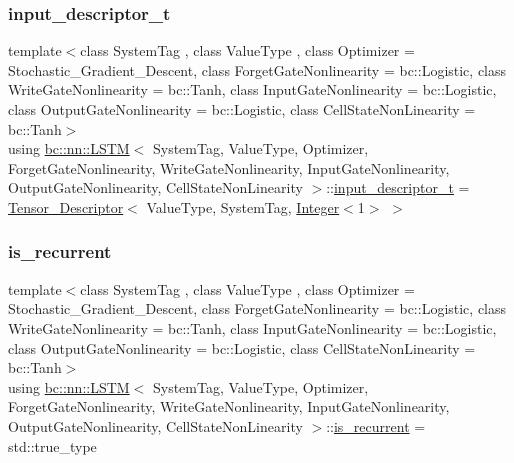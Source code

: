 \mbox{\label{structbc_1_1nn_1_1LSTM_aab44654006b4410cc4a26d2a592776e1}} 
\subsubsection{\texorpdfstring{input\+\_\+descriptor\+\_\+t}{input\_descriptor\_t}}
{\footnotesize\ttfamily template$<$class System\+Tag , class Value\+Type , class Optimizer  = Stochastic\+\_\+\+Gradient\+\_\+\+Descent, class Forget\+Gate\+Nonlinearity  = bc\+::\+Logistic, class Write\+Gate\+Nonlinearity  = bc\+::\+Tanh, class Input\+Gate\+Nonlinearity  = bc\+::\+Logistic, class Output\+Gate\+Nonlinearity  = bc\+::\+Logistic, class Cell\+State\+Non\+Linearity  = bc\+::\+Tanh$>$ \\
using \hyperlink{structbc_1_1nn_1_1LSTM}{bc\+::nn\+::\+L\+S\+TM}$<$ System\+Tag, Value\+Type, Optimizer, Forget\+Gate\+Nonlinearity, Write\+Gate\+Nonlinearity, Input\+Gate\+Nonlinearity, Output\+Gate\+Nonlinearity, Cell\+State\+Non\+Linearity $>$\+::\hyperlink{structbc_1_1nn_1_1LSTM_aab44654006b4410cc4a26d2a592776e1}{input\+\_\+descriptor\+\_\+t} =  \hyperlink{structbc_1_1nn_1_1Tensor__Descriptor}{Tensor\+\_\+\+Descriptor}$<$ Value\+Type, System\+Tag, \hyperlink{structbc_1_1traits_1_1Integer}{Integer}$<$1$>$ $>$}

\mbox{\label{structbc_1_1nn_1_1LSTM_a55f56b2edacabda8d983e77692c03096}} 
\subsubsection{\texorpdfstring{is\+\_\+recurrent}{is\_recurrent}}
{\footnotesize\ttfamily template$<$class System\+Tag , class Value\+Type , class Optimizer  = Stochastic\+\_\+\+Gradient\+\_\+\+Descent, class Forget\+Gate\+Nonlinearity  = bc\+::\+Logistic, class Write\+Gate\+Nonlinearity  = bc\+::\+Tanh, class Input\+Gate\+Nonlinearity  = bc\+::\+Logistic, class Output\+Gate\+Nonlinearity  = bc\+::\+Logistic, class Cell\+State\+Non\+Linearity  = bc\+::\+Tanh$>$ \\
using \hyperlink{structbc_1_1nn_1_1LSTM}{bc\+::nn\+::\+L\+S\+TM}$<$ System\+Tag, Value\+Type, Optimizer, Forget\+Gate\+Nonlinearity, Write\+Gate\+Nonlinearity, Input\+Gate\+Nonlinearity, Output\+Gate\+Nonlinearity, Cell\+State\+Non\+Linearity $>$\+::\hyperlink{structbc_1_1nn_1_1LSTM_a55f56b2edacabda8d983e77692c03096}{is\+\_\+recurrent} =  std\+::true\+\_\+type}

